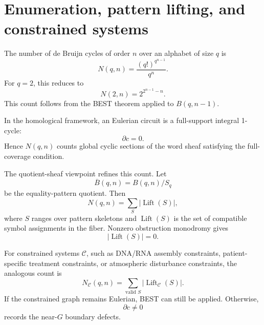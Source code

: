 \section{Enumeration, pattern lifting, and constrained systems}

The number of de Bruijn cycles of order \(n\) over an alphabet of size \(q\) is
\[
N(q,n)=\frac{(q!)^{q^{n-1}}}{q^n}.
\]
For \(q=2\), this reduces to
\[
N(2,n)=2^{2^{n-1}-n}.
\]
This count follows from the BEST theorem applied to \(B(q,n-1)\).

In the homological framework, an Eulerian circuit is a full-support integral 1-cycle:
\[
\partial c=0.
\]
Hence \(N(q,n)\) counts global cyclic sections of the word sheaf satisfying the full-coverage condition.

The quotient-sheaf viewpoint refines this count. Let
\[
\overline B(q,n)=B(q,n)/S_q
\]
be the equality-pattern quotient. Then
\[
N(q,n)=\sum_S |\operatorname{Lift}(S)|,
\]
where \(S\) ranges over pattern skeletons and \(\operatorname{Lift}(S)\) is the set of compatible symbol assignments in the fiber. Nonzero obstruction monodromy gives
\[
|\operatorname{Lift}(S)|=0.
\]

For constrained systems \(\mathcal C\), such as DNA/RNA assembly constraints, patient-specific treatment constraints, or atmospheric disturbance constraints, the analogous count is
\[
N_{\mathcal C}(q,n)=
\sum_{\text{valid }S}
|\operatorname{Lift}_{\mathcal C}(S)|.
\]
If the constrained graph remains Eulerian, BEST can still be applied. Otherwise,
\[
\partial c\neq0
\]
records the near-\(G\) boundary defects.
